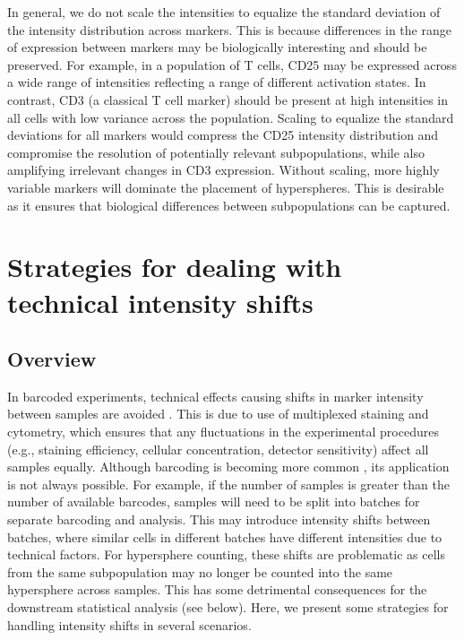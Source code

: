 \documentclass{article}
\begin{document}
In general, we do not scale the intensities to equalize the standard deviation of the intensity distribution across markers.
This is because differences in the range of expression between markers may be biologically interesting and should be preserved.
For example, in a population of T cells, CD25 may be expressed across a wide range of intensities reflecting a range of different activation states.
In contrast, CD3 (a classical T cell marker) should be present at high intensities in all cells with low variance across the population.
Scaling to equalize the standard deviations for all markers would compress the CD25 intensity distribution and compromise the resolution of potentially relevant subpopulations, while also amplifying irrelevant changes in CD3 expression.
Without scaling, more highly variable markers will dominate the placement of hyperspheres.
This is desirable as it ensures that biological differences between subpopulations can be captured. 

\section{Strategies for dealing with technical intensity shifts}

\subsection{Overview}
In barcoded experiments, technical effects causing shifts in marker intensity between samples are avoided \cite{zunder2015palladium}.
This is due to use of multiplexed staining and cytometry, which ensures that any fluctuations in the experimental procedures (e.g., staining efficiency, cellular concentration, detector sensitivity) affect all samples equally.
Although barcoding is becoming more common \cite{gaudilliere2014delayed,gaudilliere2015implementing}, its application is not always possible.
For example, if the number of samples is greater than the number of available barcodes, samples will need to be split into batches for separate barcoding and analysis.
This may introduce intensity shifts between batches, where similar cells in different batches have different intensities due to technical factors.
For hypersphere counting, these shifts are problematic as cells from the same subpopulation may no longer be counted into the same hypersphere across samples.
This has some detrimental consequences for the downstream statistical analysis (see below).
Here, we present some strategies for handling intensity shifts in several scenarios.
\end{document}
